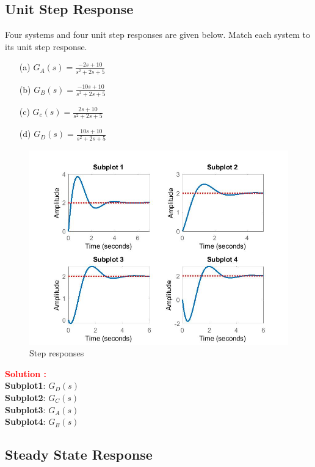 \documentclass[12pt]{article}
\begin{document}
\clearpage
\subsection{Unit Step Response}

Four systems and four unit step responses are given below. Match each system to its unit step response.
\begin{itemize}
    \item[(a)] \(G_A(s) = \frac{-2s+10}{s^2+2s+5}\)
    \item[(b)] \(G_B(s) = \frac{-10s+10}{s^2+2s+5}\)
    \item[(c)] \(G_c(s) = \frac{2s+10}{s^2+2s+5} \)
    \item[(d)] \(G_D(s) = \frac{10s+10}{s^2+2s+5}\)
\end{itemize}
\begin{figure}[h]
\centering
\includegraphics[width=\textwidth]{figs/3.13.jpg}
\caption{Step responses}
\end{figure}
\textbf{\textcolor{red}{Solution :}} \\
\textbf{Subplot1}: \(G_D(s)\) \\
\textbf{Subplot2}: \(G_C(s)\) \\
\textbf{Subplot3}: \(G_A(s)\) \\
\textbf{Subplot4}: \(G_B(s)\) \\

\clearpage
\subsection{Steady State Response}
\end{document}
